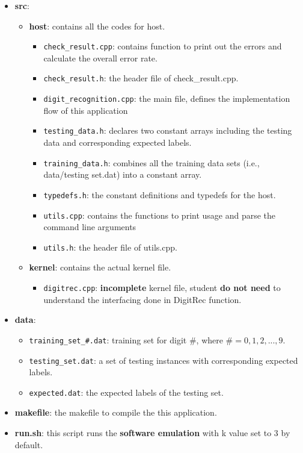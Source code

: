 \documentclass[paper=letter, fontsize=10pt]{scrartcl} %
\numberwithin{equation}{section} %
\numberwithin{figure}{section} %
\numberwithin{table}{section} %
\begin{document}
\begin{itemize}
  \item \textbf{src}: 
   	\begin{itemize}
	 	\item \textbf{host}: contains all the codes for host.
		 	\begin{itemize}
	 			\item \texttt{check\_result.cpp}: contains function to print out the errors and calculate the overall error rate.
				\item \texttt{check\_result.h}: the header file of check\_result.cpp.
	 			\item \texttt{digit\_recognition.cpp}: the main file, defines the implementation flow of this application
				\item \texttt{testing\_data.h}: declares two constant arrays including the testing data and corresponding expected labels. 
				\item \texttt{training\_data.h}: combines all the training data sets (i.e., data/testing set.dat) into a constant array. 
				\item \texttt{typedefs.h}: the constant definitions and typedefs for the host. 
				\item \texttt{utils.cpp}: contains the functions to print usage and parse the command line arguments
				\item \texttt{utils.h}: the header file of utils.cpp.
			\end{itemize}
		\item \textbf{kernel}: contains the actual kernel file.
		 	\begin{itemize}
	 			\item \texttt{digitrec.cpp}: \textbf{ incomplete} kernel file, student \textbf{do not need} to understand the interfacing done in DigitRec function.
			\end{itemize}
	\end{itemize}
  \item \textbf{data}:
  	\begin{itemize}
	 	\item \texttt{training\_set\_\#.dat}: training set for digit $\#$, where $\#=0,1,2,...,9$.
		\item \texttt{testing\_set.dat}: a set of testing instances with corresponding expected labels.
		\item \texttt{expected.dat}: the expected labels of the testing set.
	\end{itemize}
  \item \textbf{makefile}: the makefile to compile the this application.
  \item \textbf{run.sh}: this script runs the \textbf{software emulation} with k value set to 3 by default.
\end{itemize}
\end{document}
